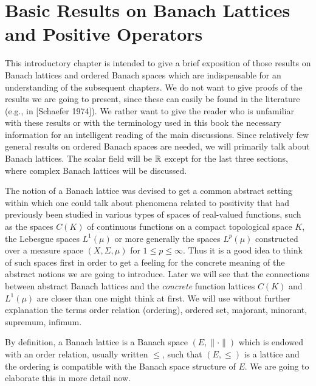 
\chapter{Basic Results on Banach Lattices and Positive Operators}\label{chap:c1}

This introductory chapter is intended to give a brief exposition of those results on Banach lattices and ordered Banach spaces which are indispensable for an understanding of the subsequent chapters.
We do not want to give proofs of the results we are going to present, since these can easily be found in the literature (e.g., in [Schaefer 1974]).
We rather want to give the reader who is unfamiliar with these results or with the terminology used in this book the necessary information for an intelligent reading of the main discussions.
Since relatively few general results on ordered Banach spaces are needed, we will primarily talk about Banach lattices.
The scalar field will be $\mathbb{R}$ except for the last three sections, where complex Banach lattices will be discussed.

The notion of a Banach lattice was devised to get a common abstract setting within which one could talk about phenomena related to positivity that had previously been studied in various types of spaces of real-valued functions, such as the spaces $ C(K) $ of continuous functions on a compact topological space $ K $, the Lebesgue spaces $ L^{1}(\mu) $ or more generally the spaces $ L^{p}(\mu) $ constructed over a measure space $ (X,\Sigma,\mu) $ for $ 1 \leq p \leq \infty $.
Thus it is a good idea to think of such spaces first in order to get a feeling for the concrete meaning of the abstract notions we are going to introduce.
Later we will see that the connections between abstract Banach lattices and the \emph{concrete} function lattices $ C(K) $ and $ L^{1}(\mu) $ are closer than one might think at first.
We will use without further explanation the terms order relation (ordering), ordered set, majorant, minorant, supremum, infimum.

\pagebreak

By definition, a Banach lattice is a Banach space $ (E,\|\cdot\|) $ which is endowed with an order relation, usually written $ \leq $, such that $ (E,\leq) $ is a lattice and the ordering is compatible with the Banach space structure of $ E $.
We are going to elaborate this in more detail now.

